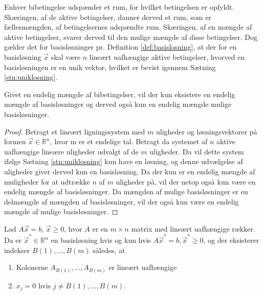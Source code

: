 Enhver bibetingelse udspænder et rum, for hvilket betingelsen er opfyldt. Skæringen, af de aktive betingelser, danner derved et rum, som er fællesmængden, af betingelsernes udspændte rum. Skæringen, af en mængde af aktive betingelser, svarer derved til den mulige mængde af disse betingelser. Dog gælder det for basisløsninger pr. Definition \ref{def:basislosning}, at der for en basisløsning $\vec{x}$ skal være $n$ lineært uafhængige aktive betingelser, hvorved en basisløsningen er en unik vektor, hvilket er bevist igennem Sætning \ref{stn:uniklosning}. %

\begin{kor}
Givet en endelig mængde af bibetingelser, vil der kun eksistere en endelig mængde af basisløsninger og derved også kun en endelig mængde mulige basisløsninger.
\end{kor}

\begin{proof}
Betragt et lineært ligningssystem med $m$ uligheder og løsningsvektorer på formen $\vec{x} \in \mathds{R}^n$, hvor m er et endelige tal.
	Betragt da systemet af $n$ aktive uafhængige lineære uligheder udvalgt af de $m$ uligheder. Da vil dette system ifølge Sætning \ref{stn:uniklosning} kun have en løsning, og denne udvælgelse af uligheder giver derved kun en basisløsning. Da der kun er en endelig mængde af muligheder for at udtrække $n$ af $m$ uligheder på, vil der netop også kun være en endelig mængde af basisløsninger. Da mængden af mulige basisløsninger er en delmængde af mængden af basisløsninger, vil der også kun være en endelig mængde af mulige basisløsninger.
\end{proof}

\begin{stn}
Lad $A\vec{x}=b$, $\vec{x}\geq 0$, hvor $A$ er en $m\times n$ matrix med lineært uafhængige rækker. Da er $\vec{x}^*\in \mathds{R}^n$ en basisløsning hvis og kun hvis $A\vec{x}^*=b, \vec{x}^* \geq 0$, og der eksisterer indekser $B(1), ..., B(m)$ således, at
\begin{enumerate}[label=(\alph*)]
\item Kolonerne $A_{B(1)}, ..., A_{B(m)}$ er lineært uafhængige
\item $x_j = 0$ hvis $j \neq B(1),...,B(m)$.
\end{enumerate}
\end{stn}

